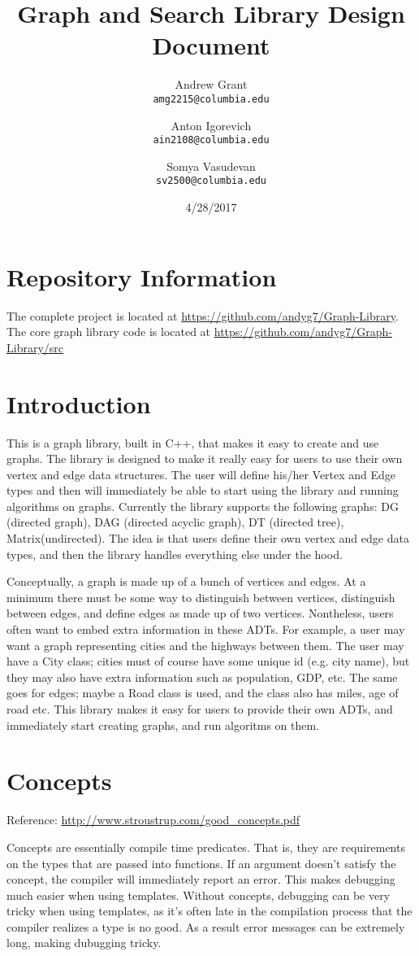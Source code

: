 \documentclass{article}
\title{Graph and Search Library Design Document}
\author{
Andrew Grant\\
\texttt{amg2215@columbia.edu}
\and 
Anton Igorevich \\
\texttt{ain2108@columbia.edu}
\and
 Somya Vasudevan \\
 \texttt{sv2500@columbia.edu}
}
\date{4/28/2017}
\begin{document}
\maketitle

\section{Repository Information}
The complete project is located at \url{https://github.com/andyg7/Graph-Library}.
The core graph library code is located at \url{https://github.com/andyg7/Graph-Library/src}

\section{Introduction}
This is a graph library, built in C++, that makes it easy to create and use graphs. The library is designed to make it really easy for users to use their own vertex and edge data structures. The user will define his/her Vertex and Edge types and then will immediately be able to start using the library and running algorithms on graphs. Currently the library supports the following graphs: DG (directed graph), DAG (directed acyclic graph), DT (directed tree), Matrix(undirected). The idea is that users define their own vertex and edge data types, and then the library handles everything else under the hood.

Conceptually, a graph is made up of a bunch of vertices and edges. At a minimum there must be some way to distinguish between vertices, distinguish between edges, and define edges as made up of two vertices. Nontheless, users often want to embed extra information in these ADTs. For example, a user may want a graph representing cities and the highways between them. The user may have a City class; cities must of course have some unique id (e.g. city name), but they may also have extra information such as population, GDP, etc. The same goes for edges; maybe a Road class is used, and the class also has miles, age of road etc. This library makes it easy for users to provide their own ADTs, and immediately start creating graphs, and run algoritms on them.

\section{Concepts}

Reference: \url{http://www.stroustrup.com/good_concepts.pdf}

Concepts are essentially compile time predicates. That is, they are requirements on the types that are passed into functions. If an argument doesn't satisfy the concept, the compiler will immediately report an error. This makes debugging much easier when using templates. Without concepts, debugging can be very tricky when using templates, as it's often late in the compilation process that the compiler realizes a type is no good. As a result error messages can be extremely long, making dubugging tricky. 
\end{document}
